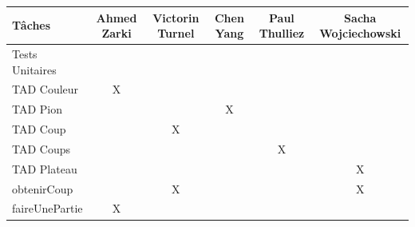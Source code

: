 \documentclass{article}
\begin{document}
 \vspace{3cm}
 \begin{tabular}{|l|c|c|c|c|c|}
   \hline
   Tâches & Ahmed Zarki & Victorin Turnel & Chen Yang & Paul Thulliez & Sacha Wojciechowski \\
   \hline
   Tests Unitaires\\
   \hline
   TAD Couleur & X & & & & \\                                                                                                                                                                       
   TAD Pion & & & X & & \\                                                                                                                                                                              
   TAD Coup & & X & &  & \\                                                                                                                                                                              
   TAD Coups & & & & X & \\                                                                                                                                                                             
   TAD Plateau & & & & & X \\
   obtenirCoup & & X & & & X \\
   faireUnePartie & X & & & & \\
   \hline
 \end{tabular}             
\end{document}
